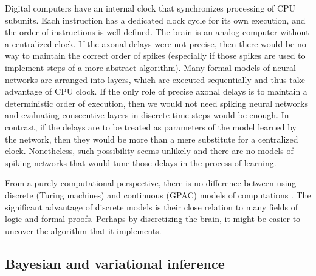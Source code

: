 \documentclass[12pt]{article}
\begin{document}
Digital computers have an internal clock that synchronizes processing of CPU subunits. Each instruction has a dedicated clock cycle for its own execution, and the order of instructions is well-defined. The brain is an analog computer without a centralized clock. If the axonal delays were not precise, then there would be no way to maintain the correct order of spikes (especially if those spikes are used to implement steps of a more abstract algorithm). Many formal models of neural networks are arranged into layers, which are executed sequentially and thus take advantage of CPU clock. If the only role of precise axonal delays is to maintain a deterministic order of execution, then we would not need spiking neural networks and evaluating consecutive layers in discrete-time steps would be enough. In contrast, if the delays are to be treated as parameters of the model learned by the network, then they would be more than a mere substitute for a centralized clock. Nonetheless, such possibility seems unlikely and there are no models of spiking networks that would tune those delays in the process of learning. 

From a purely computational perspective, there is no difference between using discrete (Turing machines) and continuous (GPAC) models of computations \cite{BOURNEZ2007317,Bournez2008}. The significant advantage of discrete models is their close relation to many fields of logic and formal proofs. Perhaps by discretizing the brain, it might be easier to uncover the algorithm that it implements. 


\subsection{Bayesian and variational inference}
\end{document}
